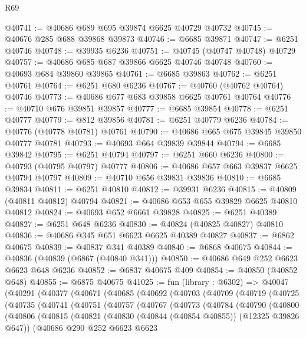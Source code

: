 \begin{lexlean}{R69}
\begin{coremodule}
{@40741 := @40686 @689 @695 @39874 @6625 @40729 @40732
@40745 := @40676 @285 @688 @39868 @39873
@40746 := @6685 @39871
@40747 := @6251 @40746
@40748 := @39935 @6236
@40751 := @40745 (@40747 @40748) @40729
@40757 := @40686 @685 @687 @39866 @6625 @40746 @40748
@40760 := @40693 @684 @39860 @39865
@40761 := @6685 @39863
@40762 := @6251 @40761
@40764 := @6251 @680 @6236
@40767 := @40760 (@40762 @40764) @40746
@40773 := @40686 @677 @683 @39858 @6625 @40761 @40764
@40776 := @40710 @676 @39851 @39857
@40777 := @6685 @39854
@40778 := @6251 @40777
@40779 := @812 @39856
@40781 := @6251 @40779 @6236
@40784 := @40776 (@40778 @40781) @40761
@40790 := @40686 @665 @675 @39845 @39850 @40777 @40781
@40793 := @40693 @664 @39839 @39844
@40794 := @6685 @39842
@40795 := @6251 @40794
@40797 := @6251 @660 @6236
@40800 := @40793 (@40795 @40797) @40777
@40806 := @40686 @657 @663 @39837 @6625 @40794 @40797
@40809 := @40710 @656 @39831 @39836
@40810 := @6685 @39834
@40811 := @6251 @40810
@40812 := @39931 @6236
@40815 := @40809 (@40811 @40812) @40794
@40821 := @40686 @653 @655 @39829 @6625 @40810 @40812
@40824 := @40693 @652 @6661 @39828
@40825 := @6251 @40389
@40827 := @6251 @648 @6236
@40830 := @40824 (@40825 @40827) @40810
@40836 := @40686 @345 @651 @6623 @6625 @40389 @40827
@40837 := @6862 @40675
@40839 := @40837 @341 @40389
@40840 := @6868 @40675
@40844 := @40836 (@40839 (@6867 (@40840 @341)))
@40850 := @40686 @649 @252 @6623 @6623 @648 @6236
@40852 := @6837 @40675 @409
@40854 := @40850 (@40852 @648)
@40855 := @6875 @40675
@41025 := fun (library : @6302) =>
  @40047
    (@40291
      (@40377
        (@40671
          (@40685
            (@40692
              (@40703
                (@40709
                  (@40719
                    (@40725
                      (@40735
                        (@40741
                          (@40751
                            (@40757
                              (@40767
                                (@40773
                                  (@40784
                                    (@40790
                                      (@40800
                                        (@40806
                                          (@40815
                                            (@40821
                                              (@40830 (@40844 (@40854 @40855)) (@12325 @39826 @647))
                                              (@40686
                                                @290
                                                @252
                                                @6623
                                                @6623
}
\end{coremodule}
\end{lexlean}
